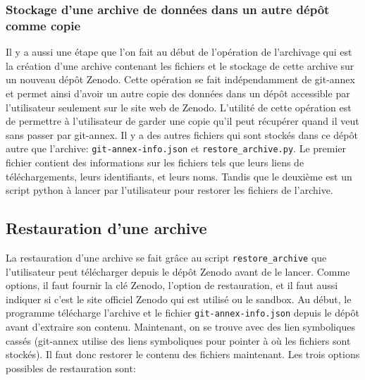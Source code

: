 \documentclass[11pt]{article}
\begin{document}
\subsubsection{Stockage d'une archive de données dans un autre dépôt comme copie}
\label{sec:orgba37874}
Il y a aussi une étape que l'on fait au début de l'opération de
l'archivage qui est la création d'une archive contenant les fichiers
et le stockage de cette archive sur un nouveau dépôt Zenodo. 
Cette opération se fait indépendamment de git-annex et permet ainsi
d'avoir un autre copie des données dans un dépôt accessible par
l'utilisateur seulement sur le site web de Zenodo.
L'utilité de cette opération est de permettre à l'utilisateur de
garder une copie qu'il peut récupérer quand il veut sans passer par
git-annex. Il y a des autres fichiers qui sont stockés dans ce dépôt
autre que l'archive: \texttt{git-annex-info.json} et \texttt{restore\_archive.py}. Le
premier fichier contient des informations sur les fichiers tels que
leurs liens de téléchargements, leurs identifiants, et leurs
noms. Tandis que le deuxième est un script python à lancer par
l'utilisateur pour restorer les fichiers de l'archive. 

\subsection{Restauration d'une archive}
\label{sec:org7f2dfe1}
La restauration d'une archive se fait grâce au script \texttt{restore\_archive}
que l'utilisateur peut télécharger depuis le dépôt Zenodo avant de le
lancer. Comme options, il faut fournir la clé Zenodo, l'option de
restauration, et il faut aussi indiquer si c'est le site officiel
Zenodo qui est utilisé ou le sandbox.
Au début, le programme télécharge l'archive et le fichier
\texttt{git-annex-info.json} depuis le dépôt avant d'extraire son
contenu. Maintenant, on se trouve avec des lien symboliques cassés
(git-annex utilise des liens symboliques pour pointer à où les
fichiers sont stockés). Il faut donc restorer le contenu des fichiers
maintenant. Les trois options possibles de restauration sont:
\end{document}

